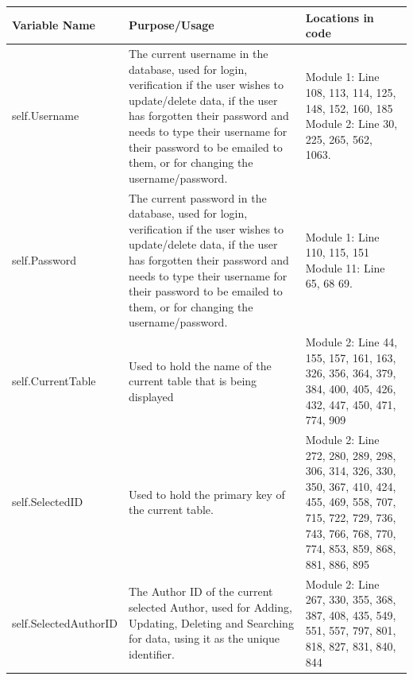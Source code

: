 \begin{center}
\begin{tabular}{|p{3.5cm}|p{4cm}|p{3cm}|}
    \hline
    \textbf{Variable Name} & \textbf{Purpose/Usage} & \textbf{Locations in code} \\ \hline
    self.Username & The current username in the database, used for login, verification if the user wishes to update/delete data, if the user has forgotten their password and needs to type their username for their password to be emailed to them, or for changing the username/password. & Module 1: Line 108, 113, 114, 125, 148, 152, 160, 185 \newline  Module 2: Line 30, 225, 265, 562, 1063. \\ \hline
    self.Password & The current password in the database, used for login, verification if the user wishes to update/delete data, if the user has forgotten their password and needs to type their username for their password to be emailed to them, or for changing the username/password. & Module 1: Line 110, 115, 151 \newline Module 11: Line 65, 68 69. \\ \hline
    self.CurrentTable & Used to hold the name of the current table that is being displayed &  Module 2: Line 44, 155, 157, 161, 163, 326, 356, 364, 379, 384, 400, 405, 426, 432, 447, 450, 471, 774, 909 \\ \hline
    self.SelectedID & Used to hold the primary key of the current table. & Module 2: Line 272, 280, 289, 298, 306, 314, 326, 330, 350, 367, 410, 424, 455, 469, 558, 707, 715, 722, 729, 736, 743, 766, 768, 770, 774, 853, 859, 868, 881, 886, 895 \\ \hline
    self.SelectedAuthorID & The Author ID of the current selected Author, used for Adding, Updating, Deleting and Searching for data, using it as the unique identifier. & Module 2: Line 267, 330, 355, 368, 387, 408, 435, 549, 551, 557, 797, 801, 818, 827, 831, 840, 844 \\ \hline
\end{tabular}
\end{center}

